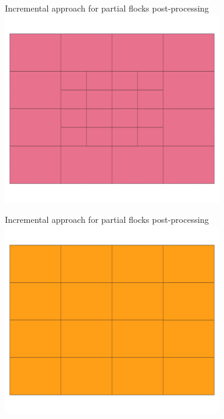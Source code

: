 \documentclass{beamer}
\begin{document}
\begin{frame}{Incremental approach for partial flocks post-processing}
    \centering
    \includegraphics[width=0.7\textwidth]{figures/Q2}
\end{frame}
\begin{frame}{Incremental approach for partial flocks post-processing}
    \centering
    \includegraphics[width=0.7\textwidth]{figures/Q3}
\end{frame}
\end{document}
